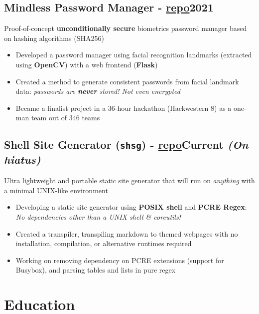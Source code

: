 \documentclass[9pt]{article}
\begin{document}
\subsection{Mindless Password Manager \normalsize\textnormal{- \href{https://github.com/ianayl/mindless}{repo}}\hfill \normalsize\textnormal{2021}}
    Proof-of-concept \textbf{unconditionally secure} biometrics password manager based on hashing algorithms (SHA256)
    \vspace{-0.5em}
\begin{itemize}
  \item Developed a password manager using facial recognition landmarks (extracted using \textbf{OpenCV}) with a web frontend (\textbf{Flask})
  \item Created a method to generate consistent passwords from facial landmark data: \textit{passwords are \textbf{never} stored! Not even encrypted}
    \item Became a finalist project in a 36-hour hackathon (Hackwestern 8) as a one-man team out of 346 teams
\end{itemize}


\subsection{Shell Site Generator (\texttt{shsg}) \normalsize\textnormal{- \href{https://github.com/ianayl/shsg}{repo}}\hfill \normalsize\textnormal{Current \textit{(On hiatus)}}}
  Ultra lightweight and portable static site generator that will run on \textit{anything} with a minimal UNIX-like environment
\vspace{-0.5em}
\begin{itemize}
  \item Developing a static site generator using \textbf{POSIX shell} and \textbf{PCRE Regex}: \textit{No dependencies other than a UNIX shell \& coreutils!}
  \item Created a transpiler, transpiling markdown to themed webpages with no installation, compilation, or alternative runtimes required
    \item Working on removing dependency on PCRE extensions (support for Busybox), and parsing tables and lists in pure regex
\end{itemize}

\section{Education}
\end{document}
